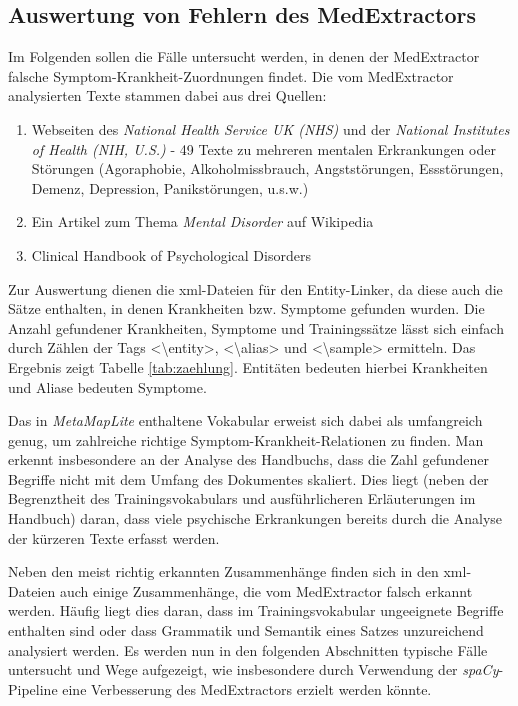 \subsection{Auswertung von Fehlern des MedExtractors}
\label{subsec:detaillierteAuswertung} 

Im Folgenden sollen die Fälle untersucht werden, in denen der MedExtractor falsche Symptom-Krankheit-Zuordnungen findet. Die vom MedExtractor analysierten Texte stammen dabei aus drei Quellen:

\begin{enumerate}
	\item Webseiten des \emph{National Health Service UK (NHS)} und der \emph{National Institutes of Health (NIH, U.S.)} - 49 Texte zu mehreren mentalen Erkrankungen oder Störungen (Agoraphobie, Alkoholmissbrauch, Angststörungen, Essstörungen, Demenz, Depression, Panikstörungen, u.s.w.) \cite{nhs_webpage} \cite{nih_webpage}
	\item Ein Artikel zum Thema \emph{Mental Disorder} auf Wikipedia \cite{wikimentaldisorder}
	\item Clinical Handbook of Psychological Disorders \cite{clinicalhandbook}
\end{enumerate}

Zur Auswertung dienen die xml-Dateien für den Entity-Linker, da diese auch die Sätze enthalten, in denen Krankheiten bzw. Symptome gefunden wurden. Die Anzahl gefundener Krankheiten, Symptome und Trainingssätze lässt sich einfach durch Zählen der Tags <\textbackslash entity>, <\textbackslash alias> und <\textbackslash sample> ermitteln. Das Ergebnis zeigt Tabelle \ref{tab:zaehlung}. Entitäten bedeuten hierbei Krankheiten und Aliase bedeuten Symptome.

Das in \emph{MetaMapLite} enthaltene Vokabular erweist sich dabei als umfangreich genug, um zahlreiche richtige Symptom-Krankheit-Relationen zu finden. Man erkennt insbesondere an der Analyse des Handbuchs, dass die Zahl gefundener Begriffe nicht mit dem Umfang des Dokumentes skaliert. Dies liegt (neben der Begrenztheit des Trainingsvokabulars und ausführlicheren Erläuterungen im Handbuch) daran, dass viele psychische Erkrankungen bereits durch die Analyse der kürzeren Texte erfasst werden.

Neben den meist richtig erkannten Zusammenhänge finden sich in den xml-Dateien auch einige Zusammenhänge, die vom MedExtractor falsch erkannt werden. Häufig liegt dies daran, dass im Trainingsvokabular ungeeignete Begriffe enthalten sind oder dass Grammatik und Semantik eines Satzes unzureichend analysiert werden. Es werden nun in den folgenden Abschnitten typische Fälle untersucht und Wege aufgezeigt, wie insbesondere durch Verwendung der \emph{spaCy}-Pipeline eine Verbesserung des MedExtractors erzielt werden könnte.

